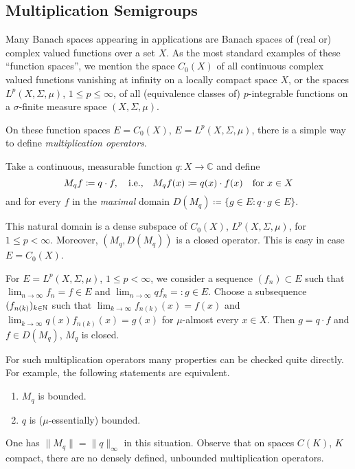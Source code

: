\subsection{Multiplication Semigroups}\label{subsec:a1-2.3}
Many Banach spaces appearing in applications are Banach spaces of (real or) complex valued functions over a set $X$.
As the most standard examples of these \enquote{function spaces}, we mention the space $C_{0}(X)$ of all continuous complex valued functions vanishing at infinity on a locally compact space $X$, or the spaces $L^{p}(X,\Sigma,\mu)$, $1 \leq p \leq \infty$, of all (equivalence classes of) $p$-integrable functions on a $\sigma$-finite measure space $(X,\Sigma,\mu)$.

On these function spaces $E = C_{0}(X)$, \resp $E = L^{p}(X,\Sigma,\mu)$, there is a simple way to define \emph{multiplication operators}.

Take a continuous, \resp measurable function $q \colon X \to \mathbb{C}$ and define
\[
    M_{q}f \coloneqq q \cdot f, \quad \text{i.e.,} \quad M_{q}f(x) 
    \coloneqq q(x) 	\cdot f(x) \quad \text{for } x \in X 
\]
and for every $f$ in the \emph{maximal} domain $D(M_{q}) \coloneqq \{g \in E \colon q \cdot g \in E\}$.

This natural domain is a dense subspace of $C_{0}(X)$, \resp $L^{p}(X,\Sigma,\mu)$, for $1 \leq p < \infty$.
Moreover, $(M_{q},D(M_{q}))$ is a closed operator.
This is easy in case $E = C_{0}(X)$.

For $E = L^{p}(X,\Sigma,\mu)$, $1 \leq p < \infty$, we consider a sequence $(f_{n}) \subset E$ such that $\lim_{n \to \infty} f_{n} = f \in E$ and $\lim_{n \to \infty} qf_{n} = \colon g \in E$.
Choose a subsequence $(f_{n(k)})_{k \in \mathbb{N}}$ such that $\lim_{k \to \infty} f_{n(k)}(x) = f(x)$ and $\lim_{k \to \infty} q(x)f_{n(k)}(x) = g(x)$ for $\mu$-almost every $x \in X$.
Then $g = q \cdot f$ and $f \in D(M_{q})$, \ie $M_{q}$ is closed.

For such multiplication operators many properties can be checked quite directly.
For example, the following statements are equivalent.
\begin{enumerate}[\upshape (a)]
\item 
$M_{q}$ is bounded.

\item 
$q$ is ($\mu$-essentially) bounded.
\end{enumerate}
One has $\|M_{q}\| = \|q\|_{\infty}$ in this situation.
Observe that on spaces $C(K)$, $K$ compact, there are no densely defined, unbounded multiplication operators.

